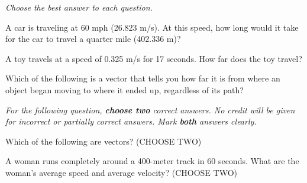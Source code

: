 \documentclass[12pt]{examdesign}
\begin{document}
\begin{multiplechoice} [title={Multiple Choice},
	rearrange=no]
	\textit{Choose the best answer to each question.} 


	\begin{question}
	A car is traveling at 60 mph (26.823 m/s).  At this speed, how long would it take for the car to travel a quarter mile (402.336 m)?
\end{question}

	\begin{question}
	A toy travels at a speed of 0.325 m/s for 17 seconds.  How far does the toy travel?
\end{question}

\begin{question}
Which of the following is a vector that tells you how far it is from where an object began moving to where it ended up, regardless of its path?

	\end{question}




\end{multiplechoice}

\begin{multiplechoice} [title={Multiple Correct Multiple Choice},
	rearrange=no]
	\textit{For the following question, \textbf{choose two} correct answers.  No credit will be given for incorrect or partially correct answers.  Mark \textbf{both} answers clearly.} 


	\begin{question}
		Which of the following are vectors? (CHOOSE TWO)
\end{question}



\begin{question}
	A woman runs completely around a 400-meter track in 60 seconds.  What are the woman's average speed and average velocity?   (CHOOSE TWO)
\end{question}

\end{multiplechoice}
\end{document}
